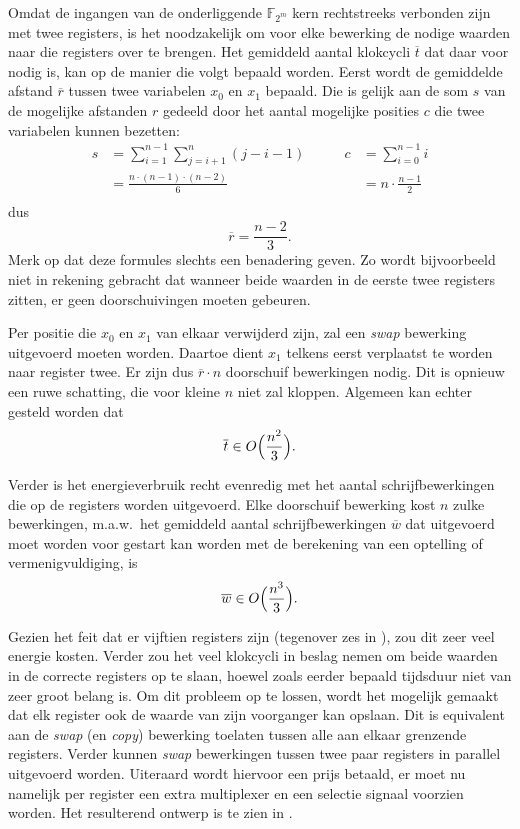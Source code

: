 Omdat de ingangen van de onderliggende $\mathbb{F}_{2^m}$ kern rechtstreeks verbonden zijn met twee registers, is het noodzakelijk om voor elke bewerking de nodige waarden naar die registers over te brengen. Het gemiddeld aantal klokcycli $\overline{t}$ dat daar voor nodig is, kan op de manier die volgt bepaald worden. Eerst wordt de gemiddelde afstand $\overline{r}$ tussen twee variabelen $x_0$ en $x_1$ bepaald. Die is gelijk aan de som $s$ van de mogelijke afstanden $r$ gedeeld door het aantal mogelijke posities $c$ die twee variabelen kunnen bezetten:
\[\begin{aligned}
s	&= \sum_{i = 1}^{n - 1} \sum_{j = i + 1}^n (j - i - 1)
	&\qquad c	&= \sum_{i = 0}^{n - 1} i\\
	&= \frac{n \cdot (n - 1) \cdot (n - 2)}{6}
	&	&= n \cdot \frac{n - 1}{2}\\
\end{aligned}\]
dus
\[\overline{r}	= \frac{n - 2}{3}.\]
Merk op dat deze formules slechts een benadering geven. Zo wordt bijvoorbeeld niet in rekening gebracht dat wanneer beide waarden in de eerste twee registers zitten, er geen doorschuivingen moeten gebeuren.

Per positie die $x_0$ en $x_1$ van elkaar verwijderd zijn, zal een \emph{swap} bewerking uitgevoerd moeten worden. Daartoe dient $x_1$ telkens eerst verplaatst te worden naar register twee. Er zijn dus $\overline{r} \cdot n$ doorschuif bewerkingen nodig. Dit is opnieuw een ruwe schatting, die voor kleine $n$ niet zal kloppen. Algemeen kan echter gesteld worden dat
\[\overline{t} \in O \Bigl( \frac{n^2}{3} \Bigr).\]

Verder is het energieverbruik recht evenredig met het aantal schrijfbewerkingen die op de registers worden uitgevoerd. Elke doorschuif bewerking kost $n$ zulke bewerkingen, m.a.w.\ het gemiddeld aantal schrijfbewerkingen $\overline{w}$ dat uitgevoerd moet worden voor gestart kan worden met de berekening van een optelling of vermenigvuldiging, is
\[\overline{w} \in O \Bigl( \frac{n^3}{3} \Bigr).\]

Gezien het feit dat er vijftien registers zijn (tegenover zes in \cite{lee}), zou dit zeer veel energie kosten. Verder zou het veel klokcycli in beslag nemen om beide waarden in de correcte registers op te slaan, hoewel zoals eerder bepaald tijdsduur niet van zeer groot belang is. Om dit probleem op te lossen, wordt het mogelijk gemaakt dat elk register ook de waarde van zijn voorganger kan opslaan. Dit is equivalent aan de \emph{swap} (en \emph{copy}) bewerking toelaten tussen alle aan elkaar grenzende registers. Verder kunnen \emph{swap} bewerkingen tussen twee paar registers in parallel uitgevoerd worden. Uiteraard wordt hiervoor een prijs betaald, er moet nu namelijk per register een extra multiplexer en een selectie signaal voorzien worden.  Het resulterend ontwerp is te zien in .


